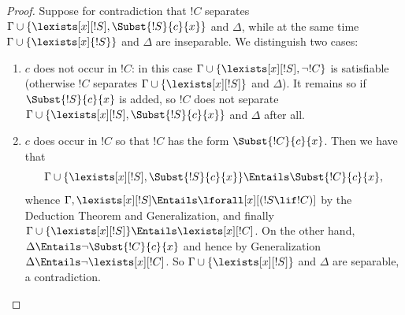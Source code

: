 \documentclass[../../../include/open-logic-section]{subfiles}
\begin{document}
\begin{proof}
Suppose for contradiction that $!C$ separates $\Gamma \cup \{
\lexists[x][!S], \Subst{!S}{c}{x}\}$ and $\Delta$, while at the same
time $\Gamma \cup \{\lexists[x]{!S} \}$ and $\Delta$ are
inseparable. We distinguish two cases:
\begin{enumerate}
\item $c$ does not occur in $!C$: in this case $\Gamma \cup
  \{\lexists[x][!S], \lnot!C \}$ is satisfiable (otherwise $!C$
  separates $\Gamma \cup \{\lexists[x][!S] \}$ and $\Delta$). It
  remains so if $\Subst{!S}{c}{x}$ is added, so $!C$ does not separate
  $\Gamma \cup \{ \lexists[x][!S], \Subst{!S}{c}{x} \}$ and $\Delta$
  after all.
\item $c$ does occur in $!C$ so that $!C$ has the form
  $\Subst{!C}{c}{x}$. Then we have that
  \[
  \Gamma \cup \{ \lexists[x][!S], \Subst{!S}{c}{x}\} \Entails \Subst{!C}{c}{x},
  \]
  whence $\Gamma, \lexists[x][!S] \Entails \lforall[x][(!S \lif !C)]$
  by the Deduction Theorem and Generalization, and finally $\Gamma
  \cup \{ \lexists[x][!S] \} \Entails \lexists[x][!C]$. On the other
  hand, $\Delta \Entails \lnot \Subst{!C}{c}{x}$ and hence by
  Generalization $\Delta \Entails \lnot \lexists[x][!C]$. So $\Gamma
  \cup \{\lexists[x][!S] \}$ and $\Delta$ are separable, a
  contradiction.
\end{enumerate}
\end{proof}
\end{document}
